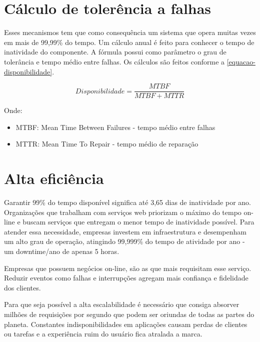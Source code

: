\section{Cálculo de tolerência a falhas}

Esses mecanismos tem que como consequência um sistema que opera
muitas vezes em mais de 99,99\% do tempo.
Um cálculo anual é feito para conhecer o tempo de inatividade do componente.
A fórmula possui como parâmetro o grau de tolerância e tempo médio entre falhas.
Os cálculos são feitos conforme a \autoref{equacao-disponibilidade}.

\begin{equation}\label{equacao-disponibilidade}
Disponibilidade = \frac{MTBF}{MTBF + MTTR}
\end{equation}

Onde:

\begin{itemize}

	\item MTBF: Mean Time Between Failures - tempo médio entre falhas

	\item MTTR: Mean Time To Repair - tempo médio de reparação

\end{itemize}

\section{Alta eficiência}

Garantir 99\% do tempo disponível significa até 3,65 dias de inatividade por ano.
Organizações que trabalham com serviços web priorizam o máximo do tempo on-line e buscam
serviços que entregam o menor tempo de inatividade possível.
Para atender essa necessidade, empresas investem em infraestrutura e desempenham um alto
grau de operação, atingindo 99,999\% do tempo de atividade por ano - um downtime/ano de
apenas 5 horas.

Empresas que possuem negócios on-line, são as que mais requisitam esse serviço.
Reduzir eventos como falhas e interrupções agregam mais confiança e fidelidade dos clientes.

Para que seja possível a alta escalabilidade é necessário que consiga absorver milhões de
requisições por segundo que podem ser oriundas de todas as partes do planeta.
Constantes indisponibilidades em aplicações causam perdas de clientes ou tarefas e a experiência
ruim do usuário fica atralada a marca.

